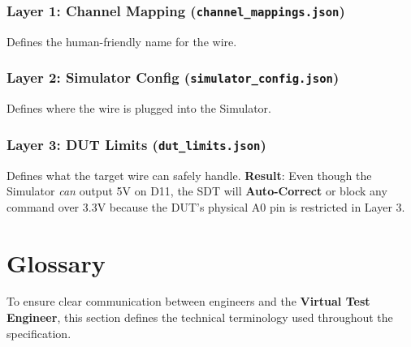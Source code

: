 \documentclass[conference]{IEEEtran}
\begin{document}
\subsubsection{Layer 1: Channel Mapping (\texttt{channel\_mappings.json})}
Defines the human-friendly name for the wire.
\subsubsection{Layer 2: Simulator Config (\texttt{simulator\_config.json})}
Defines where the wire is plugged into the Simulator.
\subsubsection{Layer 3: DUT Limits (\texttt{dut\_limits.json})}
Defines what the target wire can safely handle.
\textbf{Result}: Even though the Simulator \textit{can} output 5V on D11, the SDT will \textbf{Auto-Correct} or block any command over 3.3V because the DUT's physical A0 pin is restricted in Layer 3.

\section{Glossary}
To ensure clear communication between engineers and the \textbf{Virtual Test Engineer}, this section defines the technical terminology used throughout the specification.
\end{document}
